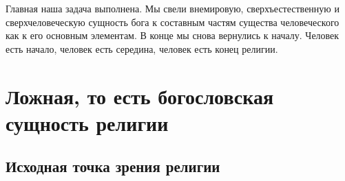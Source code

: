 \documentclass[12pt,oneside]{book}
\begin{document}
Главная наша задача выполнена. Мы свели внемировую, сверхъестественную и сверхчеловеческую сущность бога к составным частям существа человеческого как к его основным элементам. В конце мы снова вернулись к началу. Человек есть начало, человек есть середина, человек есть конец религии.





\part{Ложная, то есть богословская сущность религии}


\chapter{Исходная точка зрения религии}
\end{document}
